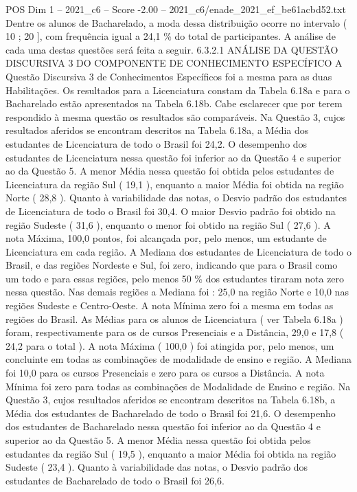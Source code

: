\begin{textsample}{POS Dim 1 – 2021\_c6 – Score -2.00 – 2021\_c6/enade\_2021\_ef\_be61acbd52.txt}
Dentre os alunos de Bacharelado, a moda dessa distribuição ocorre no intervalo ( 10 ; 20 ], com frequência igual a 24,1 \% do total de participantes.
A análise de cada uma destas questões será feita a seguir. 6.3.2.1 ANÁLISE DA QUESTÃO DISCURSIVA 3 DO COMPONENTE DE CONHECIMENTO ESPECÍFICO A Questão Discursiva 3 de Conhecimentos Específicos foi a mesma para as duas Habilitações.
Os resultados para a Licenciatura constam da Tabela 6.18a e para o Bacharelado estão apresentados na Tabela 6.18b.
Cabe esclarecer que por terem respondido à mesma questão os resultados são comparáveis.
Na Questão 3, cujos resultados aferidos se encontram descritos na Tabela 6.18a, a Média dos estudantes de Licenciatura de todo o Brasil foi 24,2.
O desempenho dos estudantes de Licenciatura nessa questão foi inferior ao da Questão 4 e superior ao da Questão 5.
A menor Média nessa questão foi obtida pelos estudantes de Licenciatura da região Sul ( 19,1 ), enquanto a maior Média foi obtida na região Norte ( 28,8 ).
Quanto à variabilidade das notas, o Desvio padrão dos estudantes de Licenciatura de todo o Brasil foi 30,4.
O maior Desvio padrão foi obtido na região Sudeste ( 31,6 ), enquanto o menor foi obtido na região Sul ( 27,6 ).
A nota Máxima, 100,0 pontos, foi alcançada por, pelo menos, um estudante de Licenciatura em cada região.
A Mediana dos estudantes de Licenciatura de todo o Brasil, e das regiões Nordeste e Sul, foi zero, indicando que para o Brasil como um todo e para essas regiões, pelo menos 50 \% dos estudantes tiraram nota zero nessa questão.
Nas demais regiões a Mediana foi : 25,0 na região Norte e 10,0 nas regiões Sudeste e Centro-Oeste.
A nota Mínima zero foi a mesma em todas as regiões do Brasil.
As Médias para os alunos de Licenciatura ( ver Tabela 6.18a ) foram, respectivamente para os de cursos Presenciais e a Distância, 29,0 e 17,8 ( 24,2 para o total ).
A nota Máxima ( 100,0 ) foi atingida por, pelo menos, um concluinte em todas as combinações de modalidade de ensino e região.
A Mediana foi 10,0 para os cursos Presenciais e zero para os cursos a Distância.
A nota Mínima foi zero para todas as combinações de Modalidade de Ensino e região.
Na Questão 3, cujos resultados aferidos se encontram descritos na Tabela 6.18b, a Média dos estudantes de Bacharelado de todo o Brasil foi 21,6.
O desempenho dos estudantes de Bacharelado nessa questão foi inferior ao da Questão 4 e superior ao da Questão 5.
A menor Média nessa questão foi obtida pelos estudantes da região Sul ( 19,5 ), enquanto a maior Média foi obtida na região Sudeste ( 23,4 ).
Quanto à variabilidade das notas, o Desvio padrão dos estudantes de Bacharelado de todo o Brasil foi 26,6.

\end{textsample}
